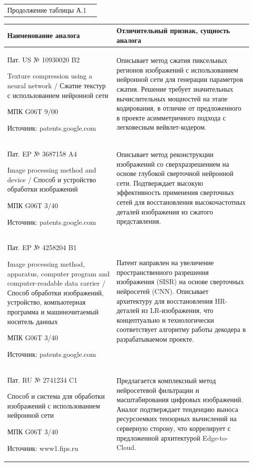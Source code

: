 \newpage

\noindent\begin{tabularx}{\textwidth}{@{}l X@{}}
Продолжение таблицы А.1
\end{tabularx}
\vspace{0.5em}

\noindent
\begin{tabularx}{\textwidth}{|p{}|X|}
\hline
\centering Наименование аналога & \centering\arraybackslash Отличительный признак, сущность аналога \\ \hline
Пат. US № 10930020 B2\par Texture compression using a neural network / Сжатие текстур с использованием нейронной сети\par МПК G06T 9/00\par Источник: patents.google.com &
Описывает метод сжатия пиксельных регионов изображений с использованием нейронной сети для генерации параметров сжатия. Решение требует значительных вычислительных мощностей на этапе кодирования, в отличие от предложенного в проекте асимметричного подхода с легковесным вейвлет-кодером.
\\ \hline
Пат. EP № 3687158 A4\par Image processing method and device / Способ и устройство обработки изображений\par МПК G06T 3/40\par Источник: patents.google.com &
Описывает метод реконструкции изображений со сверхразрешением на основе глубокой сверточной нейронной сети. Подтверждает высокую эффективность применения сверточных сетей для восстановления высокочастотных деталей изображения из сжатого представления.
\\ \hline
Пат. EP № 4258204 B1\par Image processing method, apparatus, computer program and computer-readable data carrier / Способ обработки изображений, устройство, компьютерная программа и машиночитаемый носитель данных\par МПК G06T 3/40\par Источник: patents.google.com &
Патент направлен на увеличение пространственного разрешения изображения (SISR) на основе сверточных нейросетей (CNN). Описывает архитектуру для восстановления HR-деталей из LR-изображения, что концептуально и технологически соответствует алгоритму работы декодера в разрабатываемом проекте.
\\ \hline
Пат. RU № 2741234 C1\par Способ и система для обработки изображений с использованием нейронной сети\par МПК G06T 3/40\par Источник: www1.fips.ru &
Предлагается комплексный метод нейросетевой фильтрации и масштабирования цифровых изображений.  Аналог подтверждает тенденцию выноса ресурсоемких тензорных вычислений на серверную сторону, что коррелирует с предложенной архитектурой Edge-to-Cloud.
\\ \hline
\end{tabularx}

